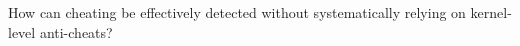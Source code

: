 How can cheating be effectively detected without systematically relying on kernel-level anti-cheats?